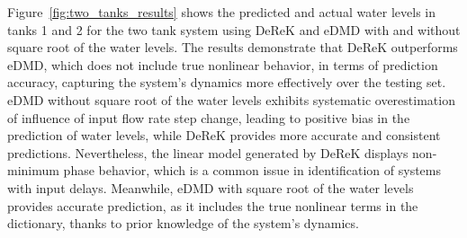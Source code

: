 \documentclass[conference]{IEEEtran}
\begin{document}
Figure~\ref{fig:two_tanks_results} shows the predicted and actual water levels in tanks 1 and 2 for the two tank system using DeReK and eDMD with and without square root of the water levels. The results demonstrate that DeReK outperforms eDMD, which does not include true nonlinear behavior, in terms of prediction accuracy, capturing the system's dynamics more effectively over the testing set. eDMD without square root of the water levels exhibits systematic overestimation of influence of input flow rate step change, leading to positive bias in the prediction of water levels, while DeReK provides more accurate and consistent predictions. Nevertheless, the linear model generated by DeReK displays non-minimum phase behavior, which is a common issue in identification of systems with input delays. Meanwhile, eDMD with square root of the water levels provides accurate prediction, as it includes the true nonlinear terms in the dictionary, thanks to prior knowledge of the system's dynamics.
\end{document}
